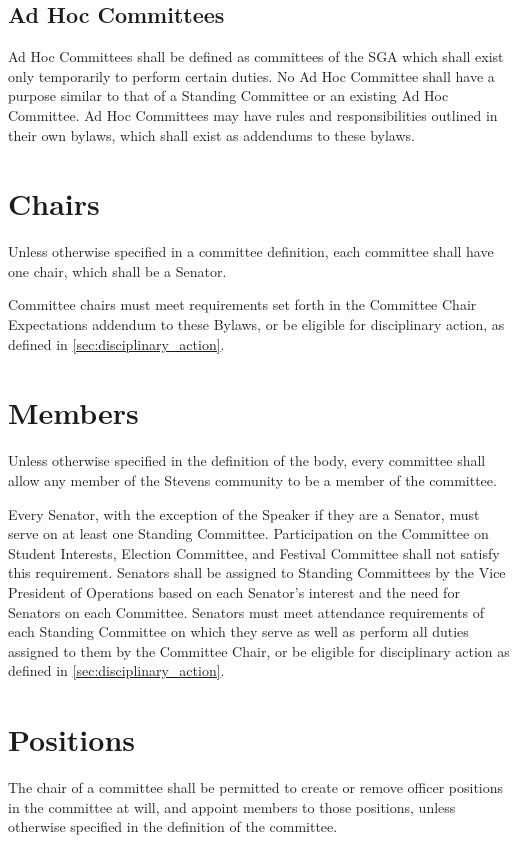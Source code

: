\documentclass[12pt]{scrreprt}
\begin{document}
\subsection{Ad Hoc Committees}
Ad Hoc Committees shall be defined as committees of the SGA which shall exist only temporarily to perform certain duties. No Ad Hoc Committee shall have a purpose similar to that of a Standing Committee or an existing Ad Hoc Committee. Ad Hoc Committees may have rules and responsibilities outlined in their own bylaws, which shall exist as addendums to these bylaws.

\section{Chairs}
Unless otherwise specified in a committee definition, each committee shall 
have one chair, which shall be a Senator.

Committee chairs must meet requirements set forth in the Committee Chair Expectations addendum to these Bylaws, or be eligible for disciplinary action, as defined in \ref{sec:disciplinary_action}.

\section{Members}
Unless otherwise specified in the definition of the body, every committee 
shall allow any member of the Stevens community to be a member of the 
committee.

Every Senator, with the exception of the Speaker if they are a Senator, must serve on at least one Standing Committee. Participation on the Committee on Student Interests, Election Committee, and Festival Committee shall not satisfy this requirement. 
Senators shall be assigned to Standing Committees by the Vice President of Operations based on each Senator’s interest and the need for Senators on each Committee. Senators must meet attendance requirements of each Standing Committee on which they serve as well as perform all duties assigned to them by the Committee Chair, or be eligible for disciplinary action as defined in \ref{sec:disciplinary_action}.

\section{Positions}
The chair of a committee shall be permitted to create or remove officer 
positions in the committee at will, and appoint members to those positions, 
unless otherwise specified in the definition of the committee.
\end{document}
